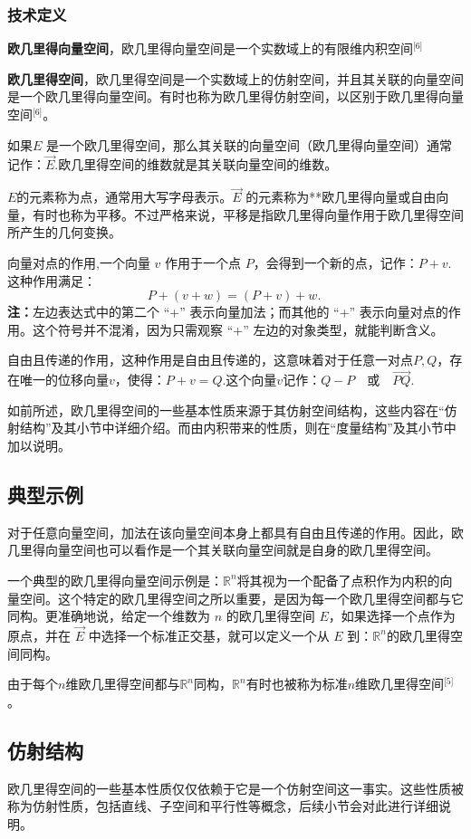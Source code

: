 \subsubsection{技术定义}
\textbf{欧几里得向量空间}，欧几里得向量空间是一个实数域上的有限维内积空间\(^\text{[6]}\)

\textbf{欧几里得空间}，欧几里得空间是一个实数域上的仿射空间，并且其关联的向量空间是一个欧几里得向量空间。有时也称为欧几里得仿射空间，以区别于欧几里得向量空间\(^\text{[6]}\)。

如果$E$ 是一个欧几里得空间，那么其关联的向量空间（欧几里得向量空间）通常记作：$\overrightarrow{E}$.欧几里得空间的维数就是其关联向量空间的维数。

$E$的元素称为点，通常用大写字母表示。$\overrightarrow{E}$ 的元素称为**欧几里得向量或自由向量，有时也称为平移。不过严格来说，平移是指欧几里得向量作用于欧几里得空间所产生的几何变换。

向量对点的作用,一个向量 $v$ 作用于一个点 $P$，会得到一个新的点，记作：$P + v$.这种作用满足：
$$
P + (v + w) = (P + v) + w.~
$$
\textbf{注：}左边表达式中的第二个 “+” 表示向量加法；而其他的 “+” 表示向量对点的作用。这个符号并不混淆，因为只需观察 “+” 左边的对象类型，就能判断含义。

自由且传递的作用，这种作用是自由且传递的，这意味着对于任意一对点$P, Q$，存在唯一的位移向量$v$，使得：$P + v = Q$.这个向量$v$记作：$Q - P\quad \text{或} \quad\overrightarrow{PQ}$.

如前所述，欧几里得空间的一些基本性质来源于其仿射空间结构，这些内容在“仿射结构”及其小节中详细介绍。而由内积带来的性质，则在“度量结构”及其小节中加以说明。
\subsection{典型示例}
对于任意向量空间，加法在该向量空间本身上都具有自由且传递的作用。因此，欧几里得向量空间也可以看作是一个其关联向量空间就是自身的欧几里得空间。

一个典型的欧几里得向量空间示例是：$\mathbb{R}^n$将其视为一个配备了点积作为内积的向量空间。这个特定的欧几里得空间之所以重要，是因为每一个欧几里得空间都与它同构。更准确地说，给定一个维数为 $n$ 的欧几里得空间 $E$，如果选择一个点作为原点，并在 $\overrightarrow{E}$ 中选择一个标准正交基，就可以定义一个从 $E$ 到：$\mathbb{R}^n$的欧几里得空间同构。

由于每个$n$维欧几里得空间都与$\mathbb{R}^n$同构，$\mathbb{R}^n$有时也被称为标准$n$维欧几里得空间\(^\text{[5]}\)。
\subsection{仿射结构}
欧几里得空间的一些基本性质仅仅依赖于它是一个仿射空间这一事实。这些性质被称为仿射性质，包括直线、子空间和平行性等概念，后续小节会对此进行详细说明。
